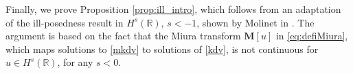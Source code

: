 \documentclass[%
11pt,  reqno]{amsart}
\newcommand{\5}{\textup{V}}
\theoremstyle{remark}
\newcommand{\R}{\mathbb{R}}
\newcommand{\MMb}{\mathbf{M}}
\newcommand{\Gc}{\mathcal{G}}
\numberwithin{equation}{section}
\numberwithin{theorem}{section}
\begin{document}


Finally, we prove Proposition \ref{prop:ill_intro}, which follows from an adaptation of the ill-posedness result in $H^s(\R)$, $s<-1$, shown by Molinet in \cite{Molinet_ill_line}. The argument is based on the fact that the Miura transform $\MMb[u]$ in \eqref{eq:defiMiura}, which 
maps solutions to \eqref{mkdv} to solutions of \eqref{kdv},
is not continuous for $u\in H^s(\R)$, for any $s<0$.
\end{document}

